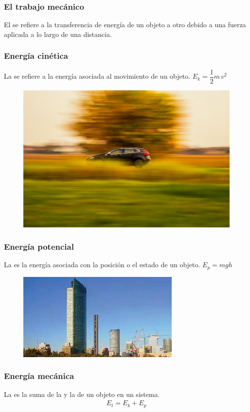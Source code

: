 \documentclass[14pt]{beamer}
\begin{document}
\begin{frame}
\frametitle{El trabajo mecánico}
El  se refiere a la transferencia de energía de un objeto a otro debido a una fuerza aplicada a lo largo de una distancia.
\end{frame}
\begin{frame}
\frametitle{Energía cinética}
La   se refiere a la energía asociada al movimiento de un objeto. $E_{k} = \dfrac{1}{2} m \, v^{2}$
\begin{figure}
    \centering
    \includegraphics[scale=0.2]{Imagenes/Energia_cinetica_01.jpg}
\end{figure}
\end{frame}
\begin{frame}
\frametitle{Energía potencial}
La  es la energía asociada con la posición o el estado de un objeto. $E_{p} = m g h$
\begin{figure}
    \centering
    \includegraphics[scale=0.7]{Imagenes/Energia_potencial_01.jpg}
\end{figure}
\end{frame}
\begin{frame}
\frametitle{Energía mecánica}
La  es la suma de la  y la  de un objeto en un sistema. 
\begin{align*}
E_{t} = E_{k} + E_{p}
\end{align*}
\end{frame}
\end{document}
